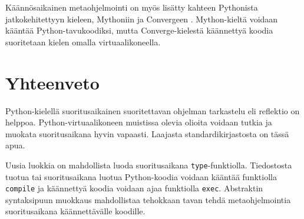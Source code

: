 \documentclass[finnish]{tktltiki2}
\theoremstyle{definition}
\theoremstyle{remark}
\begin{document}
Käännösaikainen metaohjelmointi on myös lisätty kahteen Pythonista jatkokehitettyyn kieleen, Mythoniin \cite{mython} ja Convergeen \cite{tratt05}. Mython-kieltä voidaan kääntää Python-tavukoodiksi, mutta Converge-kielestä käännettyä koodia suoritetaan kielen omalla virtuaalikoneella.

\section{Yhteenveto}

Python-kielellä suoritusaikainen suoritettavan ohjelman tarkastelu eli reflektio on helppoa. Python-virtuaalikoneen muistissa olevia olioita voidaan tutkia ja muokata suoritusaikana hyvin vapaasti. Laajasta standardikirjastosta on tässä apua. 

Uusia luokkia on mahdollista luoda suoritusaikana \verb|type|-funktiolla. Tiedostosta tuotua tai suoritusaikana luotua Python-koodia voidaan kääntää funktiolla \verb|compile| ja käännettyä koodia voidaan ajaa funktiolla \verb|exec|. Abstraktin syntaksipuun muokkaus mahdollistaa tehokkaan tavan tehdä metaohjelmointia suoritusaikana käännettävälle koodille.

\pagebreak

%
%
% 
%




\lastpage
\end{document}
